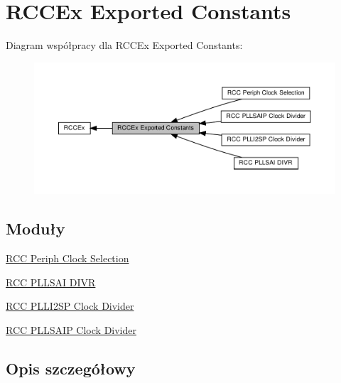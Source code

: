 \hypertarget{group___r_c_c_ex___exported___constants}{}\section{R\+C\+C\+Ex Exported Constants}
\label{group___r_c_c_ex___exported___constants}
Diagram współpracy dla R\+C\+C\+Ex Exported Constants\+:\nopagebreak
\begin{figure}[H]
\begin{center}
\leavevmode
\includegraphics[width=350pt]{group___r_c_c_ex___exported___constants}
\end{center}
\end{figure}
\subsection*{Moduły}
\begin{DoxyCompactItemize}
\item 
\hyperlink{group___r_c_c_ex___periph___clock___selection}{R\+C\+C Periph Clock Selection}
\item 
\hyperlink{group___r_c_c_ex___p_l_l_s_a_i___d_i_v_r}{R\+C\+C P\+L\+L\+S\+A\+I D\+I\+VR}
\item 
\hyperlink{group___r_c_c_ex___p_l_l_i2_s_p___clock___divider}{R\+C\+C P\+L\+L\+I2\+S\+P Clock Divider}
\item 
\hyperlink{group___r_c_c_ex___p_l_l_s_a_i_p___clock___divider}{R\+C\+C P\+L\+L\+S\+A\+I\+P Clock Divider}
\end{DoxyCompactItemize}


\subsection{Opis szczegółowy}
